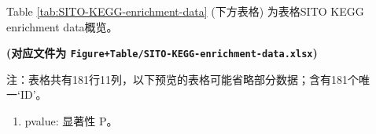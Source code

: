 \documentclass[
]{article}
\providecommand{\tightlist}{%
  \setlength{\itemsep}{0pt}\setlength{\parskip}{0pt}}
\begin{document}
Table \ref{tab:SITO-KEGG-enrichment-data} (下方表格) 为表格SITO KEGG enrichment data概览。

\textbf{(对应文件为 \texttt{Figure+Table/SITO-KEGG-enrichment-data.xlsx})}

\begin{center}\begin{tcolorbox}[colback=gray!10, colframe=gray!50, width=0.9\linewidth, arc=1mm, boxrule=0.5pt]注：表格共有181行11列，以下预览的表格可能省略部分数据；含有181个唯一`ID'。
\end{tcolorbox}
\end{center}
\begin{center}\begin{tcolorbox}[colback=gray!10, colframe=gray!50, width=0.9\linewidth, arc=1mm, boxrule=0.5pt]\begin{enumerate}\tightlist
\item pvalue:  显著性 P。
\end{enumerate}\end{tcolorbox}
\end{center}
\end{document}
